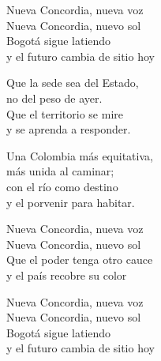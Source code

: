 \begin{lyrics}
Nueva Concordia, nueva voz\\
Nueva Concordia, nuevo sol\\
Bogotá sigue latiendo\\
y el futuro cambia de sitio hoy

Que la sede sea del Estado,\\
no del peso de ayer.\\
Que el territorio se mire\\
y se aprenda a responder.

Una Colombia más equitativa,\\
más unida al caminar;\\
con el río como destino\\
y el porvenir para habitar.

Nueva Concordia, nueva voz\\
Nueva Concordia, nuevo sol\\
Que el poder tenga otro cauce\\
y el país recobre su color

Nueva Concordia, nueva voz\\
Nueva Concordia, nuevo sol\\
Bogotá sigue latiendo\\
y el futuro cambia de sitio hoy
\end{lyrics}

